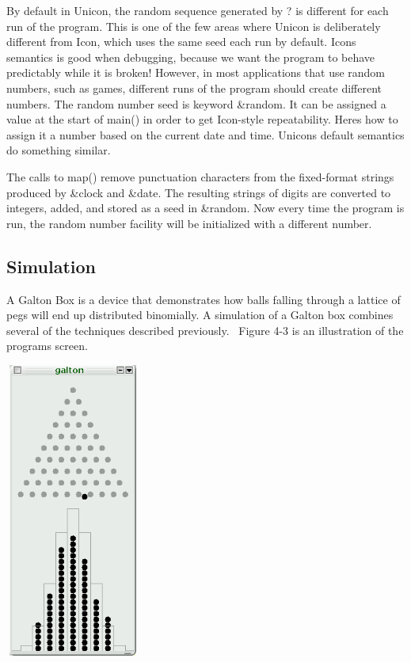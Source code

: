 By default in Unicon, the random sequence generated by \textsf{?} is
different for each run of the program. This is one of the few areas
where Unicon is deliberately different from Icon, which uses the same
seed each run by default. Icon{\textquotesingle}s semantics is good
when debugging, because we want the program to behave predictably while
it is broken! However, in most applications that use random numbers,
such as games, different runs of the program should create different
numbers. The random number seed is keyword
\textsf{\&random.} It can be assigned a value at the start of main() in
order to get Icon-style repeatability. Here{\textquotesingle}s how to
assign it a number based on the current date and time.
Unicon{\textquotesingle}s default semantics do something similar.


The calls to \textsf{map()} remove punctuation characters from the
fixed-format strings produced by \textsf{\&clock} and \textsf{\&date}.
The resulting strings of digits are converted to integers, added, and
stored as a seed in \textsf{\&random}. Now every time the program is
run, the random number facility will be initialized with a different
number.

\subsection{Simulation}

A Galton Box is a device that demonstrates how balls falling through a
lattice of pegs will end up distributed binomially. A simulation of a
Galton box combines several of the techniques described previously.
\ Figure 4-3 is an illustration of the program{\textquotesingle}s
screen.



\begin{center}
\includegraphics[width=1.75in,height=3.8201in]{ub-img/ub-img10.png}
\end{center}

